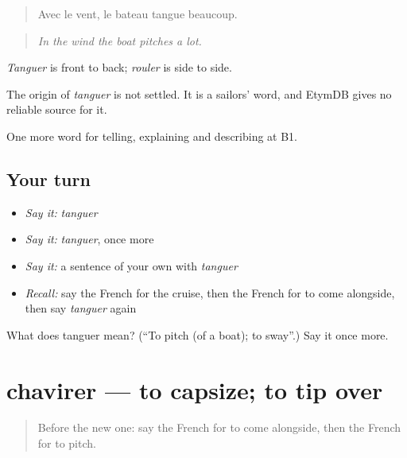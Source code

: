 \begin{quote}
Avec le vent, le bateau tangue beaucoup.
\end{quote}

\begin{quote}
\emph{In the wind the boat pitches a lot.}
\end{quote}

\emph{Tanguer} is front to back; \emph{rouler} is side to side.

\begin{cousinweb}
The origin of \emph{tanguer} is not settled. It is a sailors' word, and EtymDB gives no reliable source for it.
\end{cousinweb}

\begin{grammarlens}[title={What you've built}]
One more word for telling, explaining and describing at B1.
\end{grammarlens}

\subsection*{Your turn}
\begin{itemize}
\raggedright
  \item \emph{Say it:} \emph{tanguer}
  \item \emph{Say it:} \emph{tanguer}, once more
  \item \emph{Say it:} a sentence of your own with \emph{tanguer}
  \item \emph{Recall:} say the French for the cruise, then the French for to come alongside, then say \emph{tanguer} again
\end{itemize}

\begin{tcolorbox}[breakable,colback=teal!4,colframe=teal!35!black,title={Before you move on}]
What does tanguer mean? (\textquotedblleft{}To pitch (of a boat); to sway\textquotedblright{}.) Say it once more.
\end{tcolorbox}
\section[chavirer]{chavirer — to capsize; to tip over}

\label{lesson:FR-C423-chavirer}



\begin{quote}
Before the new one: say the French for to come alongside, then the French for to pitch.
\end{quote}

